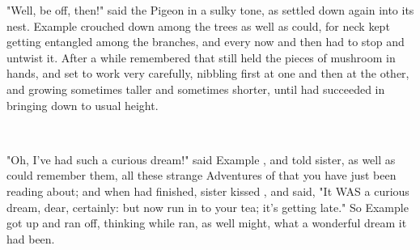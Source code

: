 \documentclass{article}
\begin{document}
\set
"Well, be off, then!" said the Pigeon in a sulky tone, as \they[2] settled down again into its nest.  Example  crouched down among the trees as well as \they could, for \their neck kept getting entangled among the branches, and every now and then \they had to stop and untwist it. After a while \they remembered that \they still held the pieces of mushroom in \their hands, and \they set to work very carefully, nibbling first at one and then at the other, and growing sometimes taller and sometimes shorter, until \they had succeeded in bringing \themself down to \their usual height.

~

\set
"Oh, I've had such a curious dream!" said  Example , and \they told \their sister, as well as \they could remember them, all these strange Adventures of \theirs that you have just been reading about; and when \they had finished, \their sister kissed \them, and said, "It WAS a curious dream, dear, certainly: but now run in to your tea; it's getting late." So  Example  got up and ran off, thinking while \they ran, as well \they might, what a wonderful dream it had been.
\end{document}

